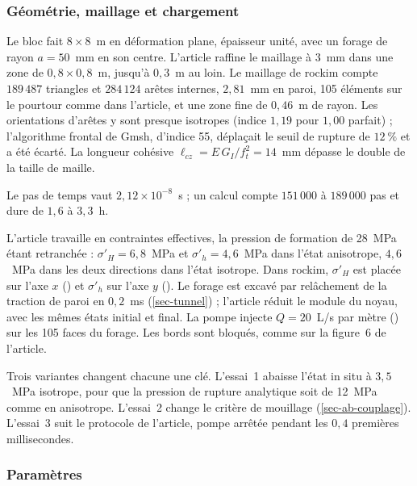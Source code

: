 \subsubsection{Géométrie, maillage et chargement}

Le bloc fait $8 \times 8$~m en déformation plane, épaisseur unité, avec un forage de rayon $a = 50$~mm en son centre. L'article raffine le maillage à 3~mm dans une zone de $0{,}8 \times 0{,}8$~m, jusqu'à $0{,}3$~m au loin. Le maillage de rockim compte $189\,487$ triangles et $284\,124$ arêtes internes, $2{,}81$~mm en paroi, 105 éléments sur le pourtour comme dans l'article, et une zone fine de $0{,}46$~m de rayon. Les orientations d'arêtes y sont presque isotropes (indice $1{,}19$ pour $1{,}00$ parfait) ; l'algorithme frontal de Gmsh, d'indice 55, déplaçait le seuil de rupture de $12~\%$ et a été écarté. La longueur cohésive $\ell_{cz} = E\,G_I/f_t^2 = 14$~mm dépasse le double de la taille de maille.

Le pas de temps vaut $2{,}12\times10^{-8}$~s ; un calcul compte $151\,000$ à $189\,000$ pas et dure de $1{,}6$ à $3{,}3$~h.

L'article travaille en contraintes effectives, la pression de formation de 28~MPa étant retranchée : $\sigma'_H = 6{,}8$~MPa et $\sigma'_h = 4{,}6$~MPa dans l'état anisotrope, $4{,}6$~MPa dans les deux directions dans l'état isotrope. Dans rockim, $\sigma'_H$ est placée sur l'axe $x$ () et $\sigma'_h$ sur l'axe $y$ (). Le forage est excavé par relâchement de la traction de paroi en $0{,}2$~ms (\cref{sec-tunnel}) ; l'article réduit le module du noyau, avec les mêmes états initial et final. La pompe injecte $Q = 20$~L/s par mètre () sur les 105 faces du forage. Les bords sont bloqués, comme sur la figure~6 de l'article.

Trois variantes changent chacune une clé. L'essai~1 abaisse l'état in situ à $3{,}5$~MPa isotrope, pour que la pression de rupture analytique soit de 12~MPa comme en anisotrope. L'essai~2 change le critère de mouillage (\cref{sec-ab-couplage}). L'essai~3 suit le protocole de l'article, pompe arrêtée pendant les $0{,}4$ premières millisecondes.

\subsubsection{Paramètres}

